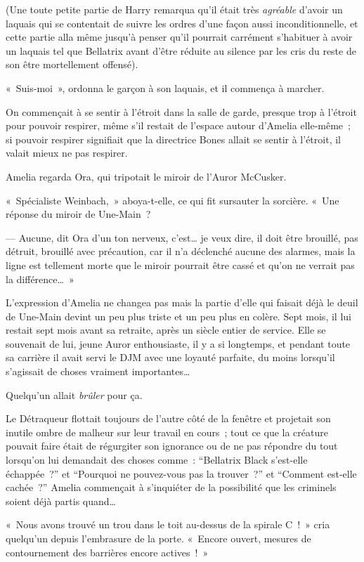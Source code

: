 (Une toute petite partie de Harry remarqua qu'il était très \emph{agréable} d'avoir un laquais qui se contentait de suivre les ordres d'une façon aussi inconditionnelle, et cette partie alla même jusqu'à penser qu'il pourrait carrément s'habituer à avoir un laquais tel que Bellatrix avant d'être réduite au silence par les cris du reste de son être mortellement offensé).

«~Suis-moi~», ordonna le garçon à son laquais, et il commença à marcher.

\later

On commençait à se sentir à l'étroit dans la salle de garde, presque trop à l'étroit pour pouvoir respirer, même s'il restait de l'espace autour d'Amelia elle-même~; si pouvoir respirer signifiait que la directrice Bones allait se sentir à l'étroit, il valait mieux ne pas respirer.

Amelia regarda Ora, qui tripotait le miroir de l'Auror McCusker.

«~Spécialiste Weinbach,~» aboya-t-elle, ce qui fit sursauter la sorcière. «~Une réponse du miroir de Une-Main~?

--- Aucune, dit Ora d'un ton nerveux, c'est… je veux dire, il doit être brouillé, pas détruit, brouillé avec précaution, car il n'a déclenché aucune des alarmes, mais la ligne est tellement morte que le miroir pourrait être cassé et qu'on ne verrait pas la différence…~»

L'expression d'Amelia ne changea pas mais la partie d'elle qui faisait déjà le deuil de Une-Main devint un peu plus triste et un peu plus en colère. Sept mois, il lui restait sept mois avant sa retraite, après un siècle entier de service. Elle se souvenait de lui, jeune Auror enthousiaste, il y a si longtemps, et pendant toute sa carrière il avait servi le DJM avec une loyauté parfaite, du moins lorsqu'il s'agissait de choses vraiment importantes…

Quelqu'un allait \emph{brûler} pour ça.

Le Détraqueur flottait toujours de l'autre côté de la fenêtre et projetait son inutile ombre de malheur sur leur travail en cours~; tout ce que la créature pouvait faire était de régurgiter son ignorance ou de ne pas répondre du tout lorsqu'on lui demandait des choses comme~: “Bellatrix Black s'est-elle échappée~?” et “Pourquoi ne pouvez-vous pas la trouver~?” et “Comment est-elle cachée~?” Amelia commençait à s'inquiéter de la possibilité que les criminels soient déjà partis quand…

«~Nous avons trouvé un trou dans le toit au-dessus de la spirale C~!~» cria quelqu'un depuis l'embrasure de la porte. «~Encore ouvert, mesures de contournement des barrières encore actives~!~»

